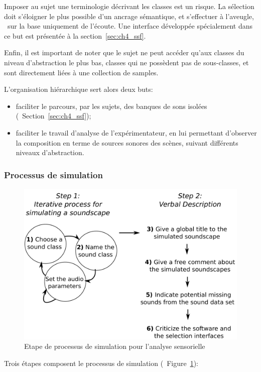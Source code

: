 Imposer au sujet une terminologie  décrivant les classes est un risque. La sélection doit s'éloigner le plus possible d'un ancrage sémantique, et s'effectuer à l'aveugle, \ie~sur la base uniquement de l'écoute. Une interface développée spécialement dans ce but est présentée à la section~\ref{sec:ch4_ssf}.

Enfin, il est important de noter que le sujet ne peut accéder qu'aux classes du niveau d'abstraction le plus bas, classes qui ne possèdent pas de sous-classes, et sont directement liées à une collection de samples.

L’organisation hiérarchique sert alors deux buts:

\begin{itemize}
\item faciliter le parcours, par les sujets, des banques de sons isolées (\cf~Section~\ref{sec:ch4_ssf});
\item faciliter le travail d'analyse de l'expérimentateur, en lui permettant d'observer la composition en terme de sources sonores des scènes, suivant différents niveaux d'abstraction.
\end{itemize}

\subsubsection{Processus de simulation}
\label{sec:ch4_processSimu}

\begin{figure}[t]
        \myfloatalign
        \includegraphics[width=.8\linewidth]{gfx/4}
       \caption{Etape de processus de simulation pour l'analyse sensorielle}\label{fig:etapeSimu}
\end{figure}

Trois étapes composent le processus de simulation (\cf~Figure~\ref{fig:etapeSimu}):

